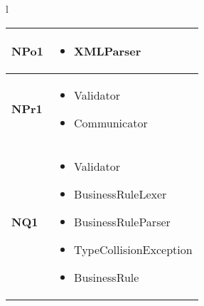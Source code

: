 \large{
\begin{tabular}{l}
\begin{tabular}{||p{3cm}||p{9cm}||} \hline

\textbf{NPo1} & 
\begin{itemize}
\item XMLParser
\end{itemize} \\ \hline
\textbf{NPr1} & 
\begin{itemize}
\item Validator
\item Communicator
\end{itemize} \\ \hline
\textbf{NQ1} & 
\begin{itemize}
\item Validator
\item BusinessRuleLexer
\item BusinessRuleParser
\item TypeCollisionException
\item BusinessRule
\end{itemize} \\ \hline
\end{tabular} \\
\end{tabular}
}



